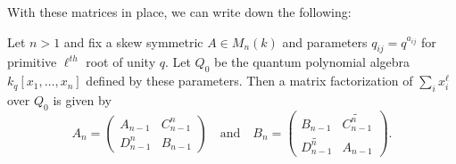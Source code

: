 \documentclass [11pt, proquest] {uwthesis}[2020/02/24]
\begin{document}
    With these matrices in place, we can write down the following:
    \begin{thm}\label{thm:factorization}
        Let $n>1$ and fix a skew symmetric $A\in M_n(k)$ and parameters $q_{ij}=q^{a_{ij}}$ for primitive $\ell^{th}$ root of unity $q.$ Let $Q_0$ be the quantum polynomial algebra $k_q[x_1,\dots,x_n]$ defined by these parameters. Then a matrix factorization of $\sum_i x_i^\ell$ over $Q_0$ is given by
        \[A_n=\begin{pmatrix}A_{n-1} & C_{n-1}^n\\D_{n-1}^n& B_{n-1}\end{pmatrix}\quad\text{and}\quad B_n=\begin{pmatrix}B_{n-1}&\widetilde{C_{n-1}^n}\\ \widetilde{D_{n-1}^n} & A_{n-1}\end{pmatrix}.\]
    \end{thm}
\end{document}
